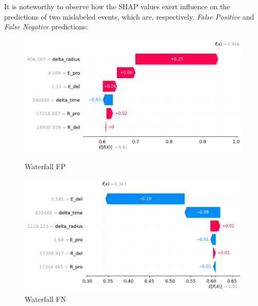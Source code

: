 It is noteworthy to observe how the SHAP values exert influence on the predictions of two mislabeled events, which are, respectively, \textit{False Positive} and \textit{False Negative} predictions:


\begin{figure}[h!]
	\centering
	\begin{minipage}{0.5\textwidth}
		\centering
		\includegraphics[width=\linewidth]{Images/Shap/waterfall_FP}
		\caption{Waterfall FP}
		\label{fig:waterfall_FP}
	\end{minipage}%
	\begin{minipage}{0.5\textwidth}
		\centering
		\includegraphics[width=\linewidth]{Images/Shap/waterfall_TN}
		\caption{Waterfall FN}
		\label{fig:waterfall_FN}
	\end{minipage}
\end{figure}


